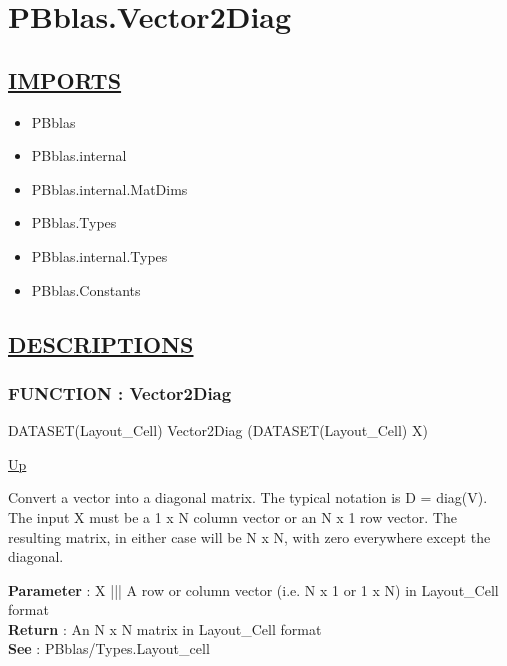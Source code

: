 \chapter*{PBblas.Vector2Diag}
\hypertarget{ecldoc:toc:PBblas.Vector2Diag}{}

\section*{\underline{IMPORTS}}
\begin{itemize}
\item PBblas
\item PBblas.internal
\item PBblas.internal.MatDims
\item PBblas.Types
\item PBblas.internal.Types
\item PBblas.Constants
\end{itemize}

\section*{\underline{DESCRIPTIONS}}
\subsection*{FUNCTION : Vector2Diag}
\hypertarget{ecldoc:pbblas.vector2diag}{}
\begin{minipage}[t]{\textwidth}
\begin{flushleft}
DATASET(Layout\_Cell) Vector2Diag (DATASET(Layout\_Cell) X)
\end{flushleft}
\end{minipage}
\hyperlink{ecldoc:toc:PBblas}{Up}

\par
Convert a vector into a diagonal matrix. The typical notation is D = diag(V). The input X must be a 1 x N column vector or an N x 1 row vector. The resulting matrix, in either case will be N x N, with zero everywhere except the diagonal.
\par
\textbf{Parameter} : X ||| A row or column vector (i.e. N x 1 or 1 x N) in Layout\_Cell format \\
\textbf{Return} : An N x N matrix in Layout\_Cell format \\
\textbf{See} : PBblas/Types.Layout\_cell \\
